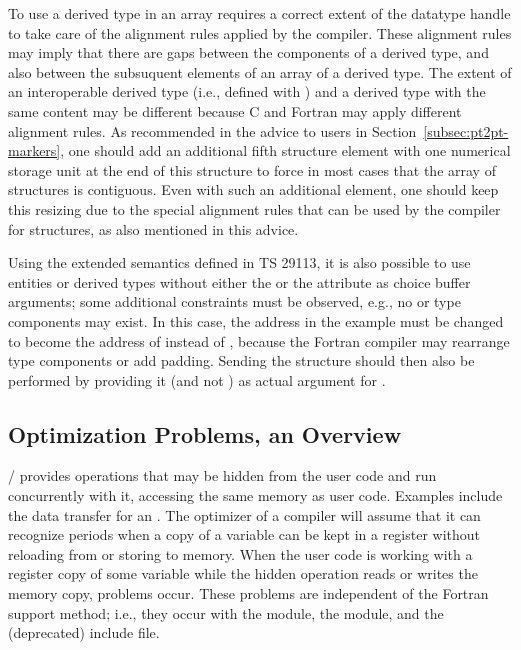 To use a derived type in an array requires a correct extent of the datatype handle
to take care of the alignment rules applied by the compiler.
These alignment rules may imply that there are gaps between
the components of a derived type, and also between the subsuquent
elements of an array of a derived type.
The extent of an interoperable derived type (i.e., defined with )
and a  derived type with the same content
may be different because C and Fortran may apply different alignment rules.
As recommended in the advice to users
in Section~\ref{subsec:pt2pt-markers},
one should add an additional fifth structure element with one numerical storage unit
at the end of this structure to force in most cases that the array of structures is contiguous.
Even with such an additional element, one should keep this resizing due to the
special alignment rules that can be used by the compiler for structures,
as also mentioned in this advice.

Using the extended semantics defined in TS 29113,
it is also possible
to use entities or derived types without either the  or the
 attribute as choice buffer arguments; some additional
constraints must be observed, e.g., no  or
 type components may exist.
In this case, the  address in the example must be changed
to become the address of  instead of , because the
Fortran compiler may rearrange type components or add padding.
Sending the structure  should then also be performed by
providing it (and not ) as actual argument for .

\subsection{Optimization Problems, an Overview}
\label{sec:misc-register}
\label{sec:f90-problems:optimization-overview}

\MPI/ provides operations that may be hidden from the user code
and run concurrently with it, accessing the same memory as user
code.  Examples include the data transfer for an
.
The optimizer of a compiler will assume that
it can recognize periods when a copy of a variable can be kept
in a register without reloading from or storing to memory.  When
the user code is working with a register copy of some variable
while the hidden operation reads or writes the memory copy, problems
occur.
These problems are independent of the
Fortran support method; i.e., they occur with
the  module, the  module,
and the (deprecated)  include file.

